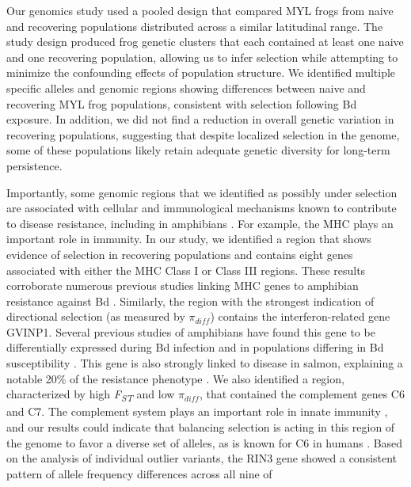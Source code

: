 \documentclass[9pt,twocolumn,twoside,lineno]{pnas-new}
\begin{document}
Our genomics study used a pooled design that compared MYL frogs from
naive and recovering populations distributed across a similar
latitudinal range. The study design produced frog genetic clusters that
each contained at least one naive and one recovering population,
allowing us to infer selection while attempting to minimize the
confounding effects of population structure. We identified multiple
specific alleles and genomic regions showing differences between naive
and recovering MYL frog populations, consistent with selection following
Bd exposure. In addition, we did not find a reduction in overall genetic
variation in recovering populations, suggesting that despite localized
selection in the genome, some of these populations likely retain
adequate genetic diversity for long-term persistence.

Importantly, some genomic regions that we identified as possibly under
selection are associated with cellular and immunological mechanisms
known to contribute to disease resistance, including in amphibians
\citep{zamudio2020}. For example, the MHC plays an important role in
immunity. In our study, we identified a region that shows evidence of
selection in recovering populations and contains eight genes associated
with either the MHC Class I or Class III regions. These results
corroborate numerous previous studies linking MHC genes to amphibian
resistance against Bd \citep[e.g.,][]{savage2011, bataille2015}.
Similarly, the region with the strongest indication of directional
selection (as measured by \(\pi_{diff}\)) contains the
interferon-related gene GVINP1. Several previous studies of amphibians
have found this gene to be differentially expressed during Bd infection
\citep[e.g.,][]{grogan2018b, ellison2014} and in populations differing
in Bd susceptibility \citep{grogan2018b}. This gene is also strongly
linked to disease in salmon, explaining a notable 20\% of the resistance
phenotype \citep[i.e., gill damage and amoebic load as heritable host
resistance traits,][]{robledo2020, robledo2018}. We also identified a
region, characterized by high \emph{F\textsubscript{ST}} and low
\(\pi_{diff}\), that contained the complement genes C6 and C7. The
complement system plays an important role in innate immunity
\citep{rieraromo2016}, and our results could indicate that balancing
selection is acting in this region of the genome to favor a diverse set
of alleles, as is known for C6 in humans \citep{soejima2005}. Based on
the analysis of individual outlier variants, the RIN3 gene showed a
consistent pattern of allele frequency differences across all nine of
\end{document}
